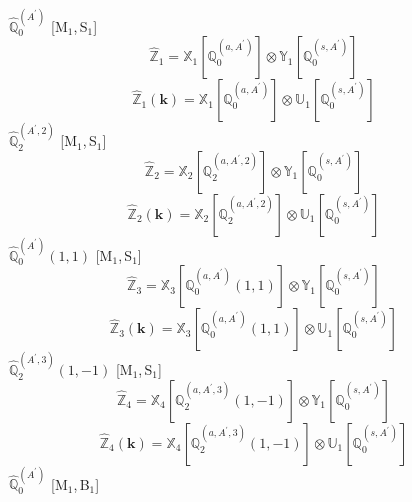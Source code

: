 \documentclass[fleqn,10pt,landscape]{article}
\begin{document}
\begin{itemize}
\vspace{4mm}
\noindent {} $\,\,\,\hat{\mathbb{Q}}_{0}^{(A^{\prime})}$ [M$_{1}$,\,S$_{1}$]
\begin{dmath*}
\hat{\mathbb{Z}}_{1}=\mathbb{X}_{1}[\mathbb{Q}_{0}^{(a,A^{\prime})}] \otimes\mathbb{Y}_{1}[\mathbb{Q}_{0}^{(s,A^{\prime})}]
\end{dmath*}
\begin{dmath*}
\hat{\mathbb{Z}}_{1}(\bm{k})=\mathbb{X}_{1}[\mathbb{Q}_{0}^{(a,A^{\prime})}] \otimes\mathbb{U}_{1}[\mathbb{Q}_{0}^{(s,A^{\prime})}]
\end{dmath*}
\vspace{4mm}
\noindent {} $\,\,\,\hat{\mathbb{Q}}_{2}^{(A^{\prime},2)}$ [M$_{1}$,\,S$_{1}$]
\begin{dmath*}
\hat{\mathbb{Z}}_{2}=\mathbb{X}_{2}[\mathbb{Q}_{2}^{(a,A^{\prime},2)}] \otimes\mathbb{Y}_{1}[\mathbb{Q}_{0}^{(s,A^{\prime})}]
\end{dmath*}
\begin{dmath*}
\hat{\mathbb{Z}}_{2}(\bm{k})=\mathbb{X}_{2}[\mathbb{Q}_{2}^{(a,A^{\prime},2)}] \otimes\mathbb{U}_{1}[\mathbb{Q}_{0}^{(s,A^{\prime})}]
\end{dmath*}
\vspace{4mm}
\noindent {} $\,\,\,\hat{\mathbb{Q}}_{0}^{(A^{\prime})}(1,1)$ [M$_{1}$,\,S$_{1}$]
\begin{dmath*}
\hat{\mathbb{Z}}_{3}=\mathbb{X}_{3}[\mathbb{Q}_{0}^{(a,A^{\prime})}(1,1)] \otimes\mathbb{Y}_{1}[\mathbb{Q}_{0}^{(s,A^{\prime})}]
\end{dmath*}
\begin{dmath*}
\hat{\mathbb{Z}}_{3}(\bm{k})=\mathbb{X}_{3}[\mathbb{Q}_{0}^{(a,A^{\prime})}(1,1)] \otimes\mathbb{U}_{1}[\mathbb{Q}_{0}^{(s,A^{\prime})}]
\end{dmath*}
\vspace{4mm}
\noindent {} $\,\,\,\hat{\mathbb{Q}}_{2}^{(A^{\prime},3)}(1,-1)$ [M$_{1}$,\,S$_{1}$]
\begin{dmath*}
\hat{\mathbb{Z}}_{4}=\mathbb{X}_{4}[\mathbb{Q}_{2}^{(a,A^{\prime},3)}(1,-1)] \otimes\mathbb{Y}_{1}[\mathbb{Q}_{0}^{(s,A^{\prime})}]
\end{dmath*}
\begin{dmath*}
\hat{\mathbb{Z}}_{4}(\bm{k})=\mathbb{X}_{4}[\mathbb{Q}_{2}^{(a,A^{\prime},3)}(1,-1)] \otimes\mathbb{U}_{1}[\mathbb{Q}_{0}^{(s,A^{\prime})}]
\end{dmath*}
\vspace{4mm}
\noindent {} $\,\,\,\hat{\mathbb{Q}}_{0}^{(A^{\prime})}$ [M$_{1}$,\,B$_{1}$]

\end{itemize}
\end{document}
